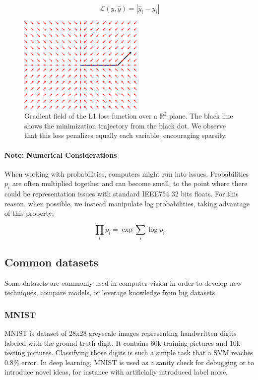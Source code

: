 \begin{equation}
    \mathcal{L}(y, \hat{y}) = |\hat{y}_i - y_i|
\end{equation}

\begin{figure}[h]
    \centering
    \includegraphics[width=6cm]{30-activity/l1.png}
    \caption{Gradient field of the L1 loss function over a $\mathbb{R}^2$ plane. The black line shows the minimization trajectory from the black dot. We observe that this loss penalizes equally each variable, encouraging sparsity.}
    \label{fig:l1}
\end{figure}


\paragraph{Note: Numerical Considerations} When working with probabilities, computers might run into issues. Probabilities $p_i$ are often multiplied together and can become small, to the point where there could be representation issues with standard IEEE754 32 bits floats. For this reason, when possible, we instead manipulate log probabilities, taking advantage of this property:

\begin{equation}
    \prod_i p_i = \exp \sum_i \log p_i
\end{equation}

\subsection{Common datasets}

Some datasets are commonly used in computer vision in order to develop new techniques, compare models, or leverage knowledge from big datasets.

\subsubsection{MNIST}

MNIST \citep{mnist} is dataset of 28x28 greyscale images representing handwritten digits labeled with the ground truth digit. It contains 60k training pictures and 10k testing pictures. Classifying those digits is such a simple task that a SVM reaches 0.8\% error. In deep learning, MNIST is used as a sanity check for debugging or to introduce novel ideas, for instance with artificially introduced label noise.

